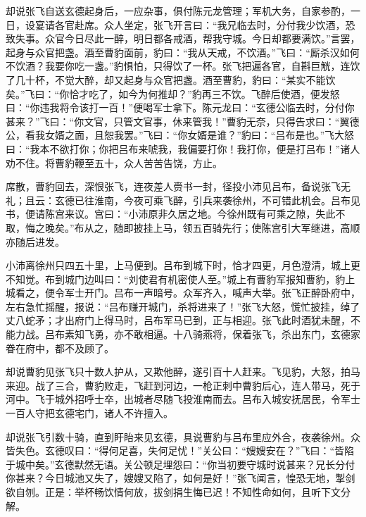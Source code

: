 却说张飞自送玄德起身后，一应杂事，俱付陈元龙管理；军机大务，自家参酌，一日，设宴请各官赴席。众人坐定，张飞开言曰：“我兄临去时，分付我少饮酒，恐致失事。众官今日尽此一醉，明日都各戒酒，帮我守城。今日却都要满饮。”言罢，起身与众官把盏。酒至曹豹面前，豹曰：“我从天戒，不饮酒。”飞曰：“厮杀汉如何不饮酒？我要你吃一盏。”豹惧怕，只得饮了一杯。张飞把遍各官，自斟巨觥，连饮了几十杯，不觉大醉，却又起身与众官把盏。酒至曹豹，豹曰：“某实不能饮矣。”飞曰：“你恰才吃了，如今为何推却？”豹再三不饮。飞醉后使酒，便发怒曰：“你违我将令该打一百！”便喝军士拿下。陈元龙曰：“玄德公临去时，分付你甚来？”飞曰：“你文官，只管文官事，休来管我！”曹豹无奈，只得告求曰：“翼德公，看我女婿之面，且恕我罢。”飞曰：“你女婿是谁？”豹曰：“吕布是也。”飞大怒曰：“我本不欲打你；你把吕布来唬我，我偏要打你！我打你，便是打吕布！”诸人劝不住。将曹豹鞭至五十，众人苦苦告饶，方止。

席散，曹豹回去，深恨张飞，连夜差人赍书一封，径投小沛见吕布，备说张飞无礼；且云：玄德已往淮南，今夜可乘飞醉，引兵来袭徐州，不可错此机会。吕布见书，便请陈宫来议。宫曰：“小沛原非久居之地。今徐州既有可乘之隙，失此不取，悔之晚矣。”布从之，随即披挂上马，领五百骑先行；使陈宫引大军继进，高顺亦随后进发。

小沛离徐州只四五十里，上马便到。吕布到城下时，恰才四更，月色澄清，城上更不知觉。布到城门边叫曰：“刘使君有机密使人至。”城上有曹豹军报知曹豹，豹上城看之，便令军士开门。吕布一声暗号。众军齐入，喊声大举。张飞正醉卧府中，左右急忙摇醒，报说：“吕布赚开城门，杀将进来了！”张飞大怒，慌忙披挂，绰了丈八蛇矛；才出府门上得马时，吕布军马已到，正与相迎。张飞此时酒犹未醒，不能力战。吕布素知飞勇，亦不敢相逼。十八骑燕将，保着张飞，杀出东门，玄德家眷在府中，都不及顾了。

却说曹豹见张飞只十数人护从，又欺他醉，遂引百十人赶来。飞见豹，大怒，拍马来迎。战了三合，曹豹败走，飞赶到河边，一枪正刺中曹豹后心，连人带马，死于河中。飞于城外招呼士卒，出城者尽随飞投淮南而去。吕布入城安抚居民，令军士一百人守把玄德宅门，诸人不许擅入。

却说张飞引数十骑，直到盱眙来见玄德，具说曹豹与吕布里应外合，夜袭徐州。众皆失色。玄德叹曰：“得何足喜，失何足忧！”关公曰：“嫂嫂安在？”飞曰：“皆陷于城中矣。”玄德默然无语。关公顿足埋怨曰：“你当初要守城时说甚来？兄长分付你甚来？今日城池又失了，嫂嫂又陷了，如何是好！”张飞闻言，惶恐无地，掣剑欲自刎。正是：举杯畅饮情何放，拔剑捐生悔已迟！不知性命如何，且听下文分解。